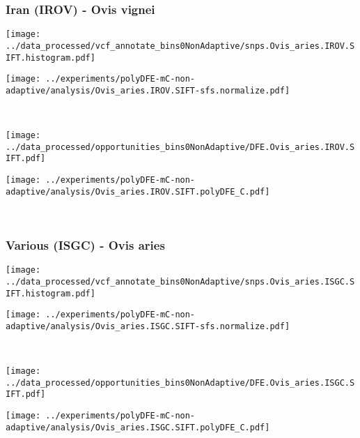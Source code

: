 \subsubsection{Iran (IROV) - Ovis vignei}

\begin{minipage}{0.49\linewidth}
    \texttt{[image: ../data\_processed/vcf\_annotate\_bins0NonAdaptive/snps.Ovis\_aries.IROV.SIFT.histogram.pdf]}
\end{minipage}
\begin{minipage}{0.49\linewidth}
    \texttt{[image: ../experiments/polyDFE-mC-non-adaptive/analysis/Ovis\_aries.IROV.SIFT-sfs.normalize.pdf]}
\end{minipage}
\\
\begin{minipage}{0.49\linewidth}
    \texttt{[image: ../data\_processed/opportunities\_bins0NonAdaptive/DFE.Ovis\_aries.IROV.SIFT.pdf]}
\end{minipage}
\begin{minipage}{0.49\linewidth}
    \texttt{[image: ../experiments/polyDFE-mC-non-adaptive/analysis/Ovis\_aries.IROV.SIFT.polyDFE\_C.pdf]}
\end{minipage}
\\

\subsubsection{Various (ISGC) - Ovis aries}

\begin{minipage}{0.49\linewidth}
    \texttt{[image: ../data\_processed/vcf\_annotate\_bins0NonAdaptive/snps.Ovis\_aries.ISGC.SIFT.histogram.pdf]}
\end{minipage}
\begin{minipage}{0.49\linewidth}
    \texttt{[image: ../experiments/polyDFE-mC-non-adaptive/analysis/Ovis\_aries.ISGC.SIFT-sfs.normalize.pdf]}
\end{minipage}
\\
\begin{minipage}{0.49\linewidth}
    \texttt{[image: ../data\_processed/opportunities\_bins0NonAdaptive/DFE.Ovis\_aries.ISGC.SIFT.pdf]}
\end{minipage}
\begin{minipage}{0.49\linewidth}
    \texttt{[image: ../experiments/polyDFE-mC-non-adaptive/analysis/Ovis\_aries.ISGC.SIFT.polyDFE\_C.pdf]}
\end{minipage}
\\

